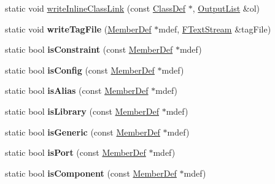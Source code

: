 \begin{DoxyCompactItemize}
static void \mbox{\hyperlink{class_vhdl_doc_gen_a67f47b8dc11d967ee47e9bda86fff7e0}{write\+Inline\+Class\+Link}} (const \mbox{\hyperlink{class_class_def}{Class\+Def}} $\ast$, \mbox{\hyperlink{class_output_list}{Output\+List}} \&ol)
\item 
\mbox{\label{class_vhdl_doc_gen_afc349098219c01208def69e00f05e0e2}} 
static void {\bfseries write\+Tag\+File} (\mbox{\hyperlink{class_member_def}{Member\+Def}} $\ast$mdef, \mbox{\hyperlink{class_f_text_stream}{F\+Text\+Stream}} \&tag\+File)
\item 
\mbox{\label{class_vhdl_doc_gen_adb04cd03e2039ecab3a0a8f31ee4c890}} 
static bool {\bfseries is\+Constraint} (const \mbox{\hyperlink{class_member_def}{Member\+Def}} $\ast$mdef)
\item 
\mbox{\label{class_vhdl_doc_gen_a57efdf5bddd0b36667c8aa21256ebac7}} 
static bool {\bfseries is\+Config} (const \mbox{\hyperlink{class_member_def}{Member\+Def}} $\ast$mdef)
\item 
\mbox{\label{class_vhdl_doc_gen_af13dd5eb831c1df008b0fd41928f4b7c}} 
static bool {\bfseries is\+Alias} (const \mbox{\hyperlink{class_member_def}{Member\+Def}} $\ast$mdef)
\item 
\mbox{\label{class_vhdl_doc_gen_a3f582b69841bae3ec6f1281604b6f0c8}} 
static bool {\bfseries is\+Library} (const \mbox{\hyperlink{class_member_def}{Member\+Def}} $\ast$mdef)
\item 
\mbox{\label{class_vhdl_doc_gen_ae3c19429669d382581ba37aee5f39278}} 
static bool {\bfseries is\+Generic} (const \mbox{\hyperlink{class_member_def}{Member\+Def}} $\ast$mdef)
\item 
\mbox{\label{class_vhdl_doc_gen_a73186f5d1ba5e6c11c6f006708da79a6}} 
static bool {\bfseries is\+Port} (const \mbox{\hyperlink{class_member_def}{Member\+Def}} $\ast$mdef)
\item 
\mbox{\label{class_vhdl_doc_gen_ad3fdc795bf951ef11221894512b8bc6c}} 
static bool {\bfseries is\+Component} (const \mbox{\hyperlink{class_member_def}{Member\+Def}} $\ast$mdef)
\item 

\end{DoxyCompactItemize}
